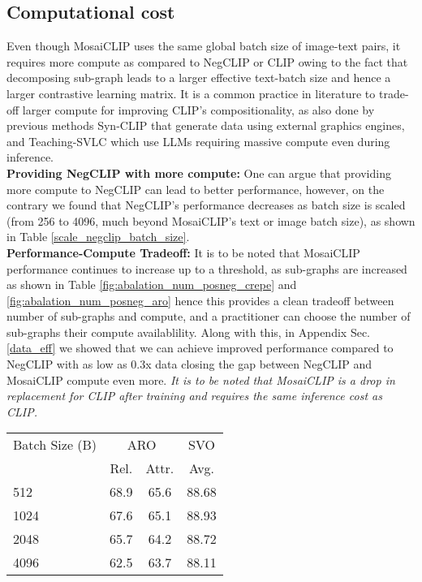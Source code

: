 \documentclass[11pt]{article}
\newcommand{\methodcomp}{MosaiCLIP}
\newcommand{\clip}{CLIP}
\newcommand{\negclip}{NegCLIP}
\begin{document}
\begin{table}[h!]
\begin{table}[h!]
    \caption{Data efficiency of \methodcomp{} during fine-tuning. Numbers in blue are lowest numbers that are within  or greater than \negclip{} performance. Fine-tuning dataset: CC-FT. Curriculum learning has not been used for these experiments.}
    \label{data_eff_ft}
\end{table}

\subsection{Computational cost}
\label{computational_cost}
Even though \methodcomp{} uses the same global batch size of image-text pairs, it requires more compute as compared to \negclip{} or \clip{} owing to the fact that decomposing sub-graph leads to a larger effective text-batch size and hence a larger contrastive learning matrix. It is a common practice in literature to trade-off larger compute for improving \clip{}'s compositionality, as also done by previous methods Syn-CLIP \citep{cascantebonilla2023going} that generate data using external graphics engines, and Teaching-SVLC \citep{doveh2023teaching} which use LLMs requiring massive compute even during inference. \\
\textbf{Providing \negclip{} with more compute:} One can argue that providing more compute to \negclip{} can lead to better performance, however, on the contrary we found that \negclip{}'s performance decreases as batch size is scaled (from 256 to 4096, much beyond \methodcomp{}'s text or image batch size), as shown in Table \ref{scale_negclip_batch_size}. \\
\textbf{Performance-Compute Tradeoff:} It is to be noted that \methodcomp{} performance continues to increase up to a threshold, as sub-graphs are increased as shown in Table \ref{fig:abalation_num_posneg_crepe} and \ref{fig:abalation_num_posneg_aro} hence this provides a clean tradeoff between number of sub-graphs and compute, and a practitioner can choose the number of sub-graphs their compute availablility. Along with this, in Appendix Sec. \ref{data_eff} we showed that we can achieve improved performance compared to \negclip{} with as low as 0.3x data closing the gap between \negclip{} and \methodcomp{} compute even more. \textit{It is to be noted that \methodcomp{} is a drop in replacement for \clip{} after training and requires the same inference cost as \clip{}.}

\begin{table}[h!]
\small
\centering
    \begin{tabular}{lccc}
    \toprule
    Batch Size (B) & \multicolumn{2}{c|}{ARO} & \multicolumn{1}{c}{SVO} \\
    \cmidrule(lr){2-3} \cmidrule(lr){4-4}
    & Rel. & Attr. & Avg. \\
    \midrule
    512 & 68.9 & 65.6 & 88.68 \\
    1024 & 67.6 & 65.1 & 88.93 \\
    2048 & 65.7 & 64.2 & 88.72 \\
    4096 & 62.5 & 63.7 & 88.11 \\
    \bottomrule
    \end{tabular}


\end{table}
\end{table}
\end{document}
